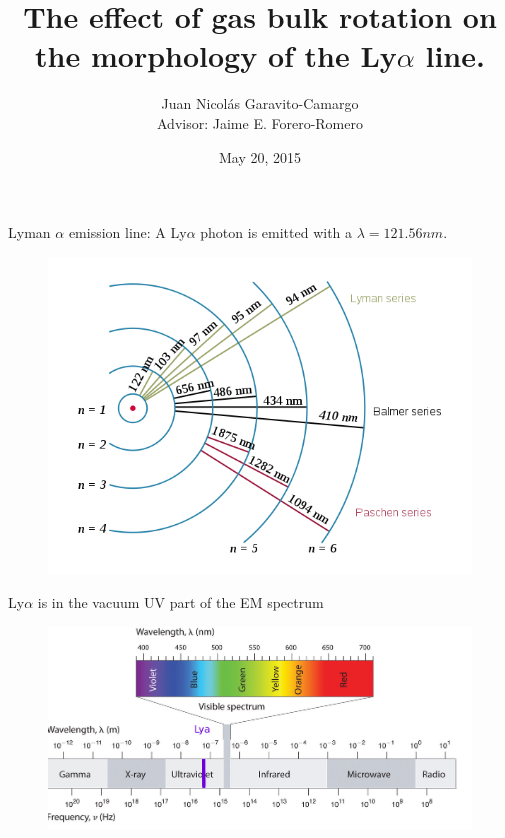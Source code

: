 \documentclass{beamer}
\title{\textbf{The effect of gas bulk rotation on the morphology of the Ly$\alpha$ line.}}
\author{Juan Nicol\'as Garavito-Camargo \\ Advisor: Jaime E. Forero-Romero}
\institute{Universidad de los Andes, Bogot\'a, Colombia}
\date{May 20, 2015}
\begin{document}


\begin{frame}{Lyman $\alpha$ emission line:}
A Ly$\alpha$ photon is emitted with a $\lambda= 121.56 nm$.
\begin{figure}
\includegraphics[scale=0.4]{Figures/Hydrogen_transitions.png}
\end{figure}
\end{frame}

\begin{frame}{Ly$\alpha$ is in the vacuum UV part of the EM spectrum}
\begin{figure}
\centering
\includegraphics[scale=0.18]{Figures/em.jpg}
\end{figure}
\end{frame}
\end{document}
